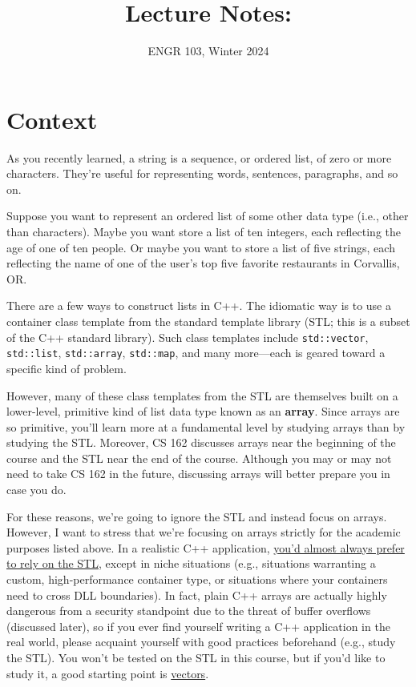 \documentclass{article}
\title{
    Lecture Notes: \lecturetitle
}
\author{ENGR 103, Winter 2024}
\date{}
\begin{document}
\maketitle

\section{Context}

As you recently learned, a string is a sequence, or ordered list, of zero or more characters. They're useful for representing words, sentences, paragraphs, and so on.

Suppose you want to represent an ordered list of some other data type (i.e., other than characters). Maybe you want store a list of ten integers, each reflecting the age of one of ten people. Or maybe you want to store a list of five strings, each reflecting the name of one of the user's top five favorite restaurants in Corvallis, OR.

There are a few ways to construct lists in C++. The idiomatic way is to use a container class template from the standard template library (STL; this is a subset of the C++ standard library). Such class templates include \texttt{std::vector}, \texttt{std::list}, \texttt{std::array}, \texttt{std::map}, and many more---each is geared toward a specific kind of problem.

However, many of these class templates from the STL are themselves built on a lower-level, primitive kind of list data type known as an \textbf{array}. Since arrays are so primitive, you'll learn more at a fundamental level by studying arrays than by studying the STL. Moreover, CS 162 discusses arrays near the beginning of the course and the STL near the end of the course. Although you may or may not need to take CS 162 in the future, discussing arrays will better prepare you in case you do.

For these reasons, we're going to ignore the STL and instead focus on arrays. However, I want to stress that we're focusing on arrays strictly for the academic purposes listed above. In a realistic C++ application, \ul{you'd almost always prefer to rely on the STL}, except in niche situations (e.g., situations warranting a custom, high-performance container type, or situations where your containers need to cross DLL boundaries). In fact, plain C++ arrays are actually highly dangerous from a security standpoint due to the threat of buffer overflows (discussed later), so if you ever find yourself writing a C++ application in the real world, please acquaint yourself with good practices beforehand (e.g., study the STL). You won't be tested on the STL in this course, but if you'd like to study it, a good starting point is \href{https://www.geeksforgeeks.org/vector-in-cpp-stl/}{vectors}.
\end{document}
